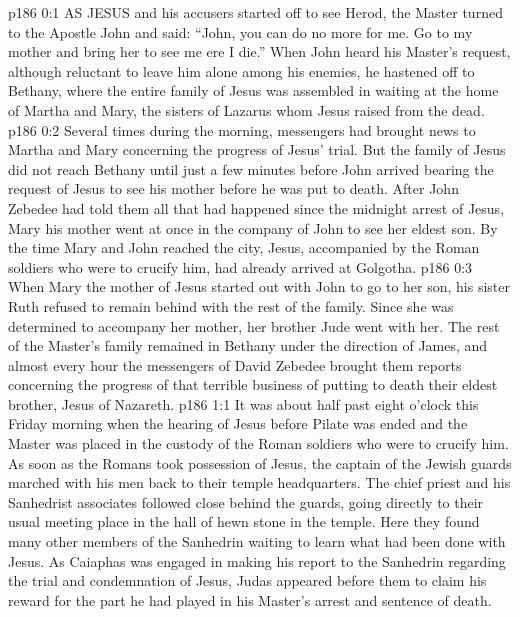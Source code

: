 \vs p186 0:1 AS JESUS and his accusers started off to see Herod, the Master turned to the Apostle John and said: \textcolor{ubdarkred}{“John, you can do no more for me. Go to my mother and bring her to see me ere I die.”} When John heard his Master’s request, although reluctant to leave him alone among his enemies, he hastened off to Bethany, where the entire family of Jesus was assembled in waiting at the home of Martha and Mary, the sisters of Lazarus whom Jesus raised from the dead.
\vs p186 0:2 Several times during the morning, messengers had brought news to Martha and Mary concerning the progress of Jesus’ trial. But the family of Jesus did not reach Bethany until just a few minutes before John arrived bearing the request of Jesus to see his mother before he was put to death. After John Zebedee had told them all that had happened since the midnight arrest of Jesus, Mary his mother went at once in the company of John to see her eldest son. By the time Mary and John reached the city, Jesus, accompanied by the Roman soldiers who were to crucify him, had already arrived at Golgotha.
\vs p186 0:3 When Mary the mother of Jesus started out with John to go to her son, his sister Ruth refused to remain behind with the rest of the family. Since she was determined to accompany her mother, her brother Jude went with her. The rest of the Master’s family remained in Bethany under the direction of James, and almost every hour the messengers of David Zebedee brought them reports concerning the progress of that terrible business of putting to death their eldest brother, Jesus of Nazareth.
\vs p186 1:1 It was about half past eight o’clock this Friday morning when the hearing of Jesus before Pilate was ended and the Master was placed in the custody of the Roman soldiers who were to crucify him. As soon as the Romans took possession of Jesus, the captain of the Jewish guards marched with his men back to their temple headquarters. The chief priest and his Sanhedrist associates followed close behind the guards, going directly to their usual meeting place in the hall of hewn stone in the temple. Here they found many other members of the Sanhedrin waiting to learn what had been done with Jesus. As Caiaphas was engaged in making his report to the Sanhedrin regarding the trial and condemnation of Jesus, Judas appeared before them to claim his reward for the part he had played in his Master’s arrest and sentence of death.
